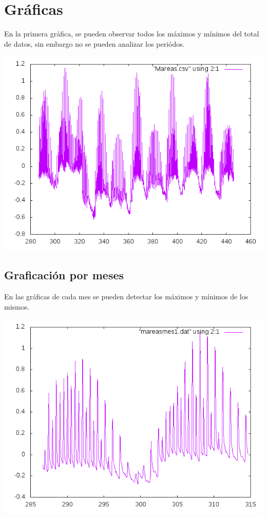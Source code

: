 \documentclass[10pt]{article}
\begin{document}
\newpage


\section{Gráficas}
En la primera gráfica, se pueden observar todos los máximos y mínimos del total de datos, sin embargo no se pueden analizar los periódos.
\begin{center}
 \includegraphics[scale=0.8]{grafica1.png}
\end{center}


\newpage
\subsection{Graficación por meses}
En las gráficas de cada mes se pueden detectar los máximos y mínimos de los mismos.
\begin{center}
   \includegraphics[scale=0.8]{month1.png}
\end{center}
\end{document}
